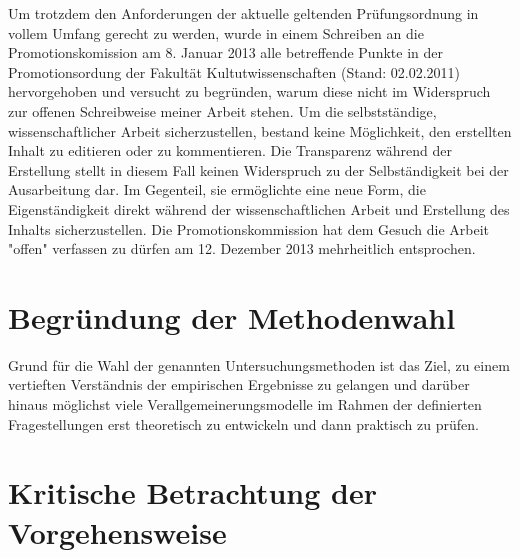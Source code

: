 Um trotzdem den Anforderungen der aktuelle geltenden Prüfungsordnung in vollem Umfang gerecht zu werden, wurde in einem Schreiben an die Promotionskomission am 8. Januar 2013 alle betreffende Punkte in der Promotionsordung der Fakultät Kultutwissenschaften (Stand: 02.02.2011) hervorgehoben und versucht zu begründen, warum diese nicht im Widerspruch zur offenen Schreibweise meiner Arbeit stehen. Um die selbstständige, wissenschaftlicher Arbeit sicherzustellen, bestand keine Möglichkeit, den erstellten Inhalt zu editieren oder zu kommentieren. Die Transparenz während der Erstellung stellt in diesem Fall keinen Widerspruch zu der Selbständigkeit bei der Ausarbeitung dar. Im Gegenteil, sie ermöglichte eine neue Form, die Eigenständigkeit direkt während der wissenschaftlichen Arbeit und Erstellung des Inhalts sicherzustellen. Die Promotionskommission hat dem Gesuch die Arbeit "offen" verfassen zu dürfen am 12. Dezember 2013 mehrheitlich entsprochen.

\section{Begründung der Methodenwahl} 

Grund für die Wahl der genannten Untersuchungsmethoden ist das Ziel, zu einem vertieften Verständnis der empirischen Ergebnisse zu gelangen und darüber hinaus möglichst viele Verallgemeinerungsmodelle im Rahmen der definierten Fragestellungen erst theoretisch zu entwickeln und dann praktisch zu prüfen.

\section{Kritische Betrachtung der Vorgehensweise} 
